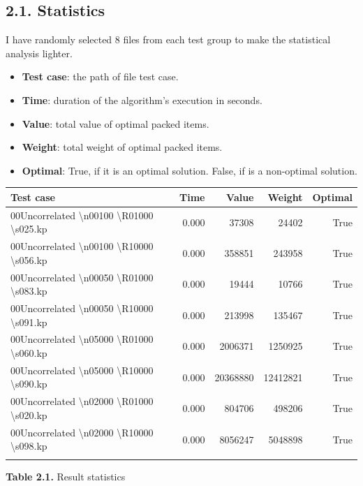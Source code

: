 \documentclass[english, a4paper,12pt]{article}
\begin{document}
\subsection*{2.1. Statistics}
\hspace*{7mm}I have randomly selected 8 files from each test group to make the statistical analysis lighter.
\begin{itemize}
\item \textbf{Test case}: the path of file test case.
\item \textbf{Time}: duration of the algorithm’s execution in seconds.
\item \textbf{Value}:  total value of optimal packed items.
\item \textbf{Weight}: total weight of optimal packed items.
\item \textbf{Optimal}: True, if it is an optimal solution. False, if is a non-optimal solution.
\end{itemize}
 \begin{center}
 \small\begin{tabularx}{0.95\textwidth}{|>{\raggedright\arraybackslash}Xrrrr|}
\hline
\textbf{Test case} & \textbf{Time} & \textbf{Value} & \textbf{Weight} & \textbf{Optimal} \\
\hline
\addlinespace
\hline
00Uncorrelated \textbackslash n00100 \textbackslash R01000 \textbackslash s025.kp & 0.000 & 37308 & 24402 & True \\
00Uncorrelated \textbackslash n00100 \textbackslash R10000 \textbackslash s056.kp & 0.000 & 358851 & 243958 & True \\
00Uncorrelated \textbackslash n00050 \textbackslash R01000 \textbackslash s083.kp & 0.000 & 19444 & 10766 & True \\
00Uncorrelated \textbackslash n00050 \textbackslash R10000 \textbackslash s091.kp & 0.000 & 213998 & 135467 & True \\
00Uncorrelated \textbackslash n05000 \textbackslash R01000 \textbackslash s060.kp & 0.000 & 2006371 & 1250925 & True \\
00Uncorrelated \textbackslash n05000 \textbackslash R10000 \textbackslash s090.kp & 0.000 & 20368880 & 12412821 & True \\
00Uncorrelated \textbackslash n02000 \textbackslash R01000 \textbackslash s020.kp & 0.000 & 804706 & 498206 & True \\
00Uncorrelated \textbackslash n02000 \textbackslash R10000 \textbackslash s098.kp & 0.000 & 8056247 & 5048898 & True \\
\hline
\addlinespace
\end{tabularx}
\begin{center}
\textbf{Table 2.1.} Result statistics
\end{center}  
 \end{center}
\end{document}
